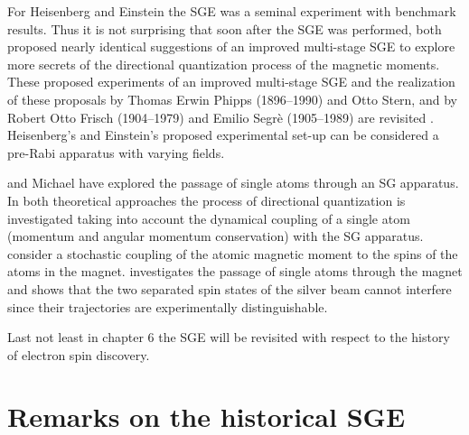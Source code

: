 \documentclass{article}
\begin{document}
For Heisenberg and Einstein the SGE was a seminal experiment with benchmark results. Thus it is not surprising that soon after the SGE was performed, both proposed nearly identical suggestions of an improved multi-stage SGE to explore more secrets of the directional quantization process of the magnetic moments. These proposed experiments of an improved multi-stage SGE and the realization of these proposals by Thomas Erwin Phipps (1896--1990) and Otto Stern, and by Robert Otto Frisch (1904--1979) and Emilio Segrè (1905--1989)  are revisited \citep{PhippsTEtal1932Einstellung,FrischOEtal1933Einstellung}. Heisenberg's and Einstein's proposed experimental set-up can be considered a pre-Rabi apparatus with varying fields. 

\cite{WennerstroemHEtal2012experiment,WennerstroemHEtal2013measurements,WennerstroemHEtal2014Interpretation} and Michael \cite{DevereuxM2015Reduction} have explored the passage of single atoms through an SG apparatus. In both theoretical approaches the process of directional quantization is investigated taking into account the dynamical coupling of a single atom (momentum and angular momentum conservation) with the SG apparatus. \cite{WennerstroemHEtal2012experiment,WennerstroemHEtal2013measurements,WennerstroemHEtal2014Interpretation} consider a stochastic coupling of the atomic magnetic moment to the spins of the atoms in the magnet.  \cite{DevereuxM2015Reduction} investigates the passage of single atoms through the magnet and shows that the two separated spin states of the silver beam cannot interfere since their trajectories are experimentally distinguishable.
 
Last not least in chapter 6 the SGE will be revisited with respect to the history of electron spin discovery. 
 
\section{Remarks on the historical SGE} 
 
\end{document}
